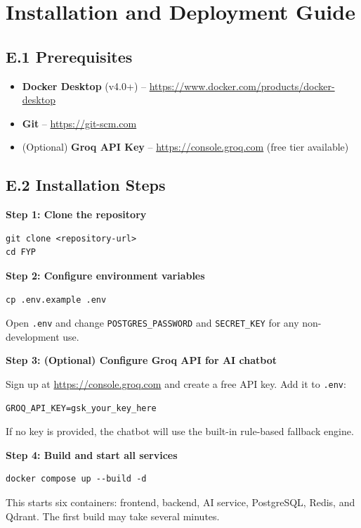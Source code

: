 \documentclass[12pt, a4paper, oneside]{report}
\begin{document}
\chapter{Installation and Deployment Guide}
\label{app:install}

\section*{E.1 Prerequisites}

\begin{itemize}
    \item \textbf{Docker Desktop} (v4.0+) -- \url{https://www.docker.com/products/docker-desktop}
    \item \textbf{Git} -- \url{https://git-scm.com}
    \item (Optional) \textbf{Groq API Key} -- \url{https://console.groq.com} (free tier available)
\end{itemize}

\section*{E.2 Installation Steps}

\textbf{Step 1: Clone the repository}
\begin{verbatim}
git clone <repository-url>
cd FYP
\end{verbatim}

\textbf{Step 2: Configure environment variables}
\begin{verbatim}
cp .env.example .env
\end{verbatim}
Open \texttt{.env} and change \texttt{POSTGRES\_PASSWORD} and \texttt{SECRET\_KEY} for any non-development use.

\textbf{Step 3: (Optional) Configure Groq API for AI chatbot}

Sign up at \url{https://console.groq.com} and create a free API key. Add it to \texttt{.env}:
\begin{verbatim}
GROQ_API_KEY=gsk_your_key_here
\end{verbatim}
If no key is provided, the chatbot will use the built-in rule-based fallback engine.

\textbf{Step 4: Build and start all services}
\begin{verbatim}
docker compose up --build -d
\end{verbatim}
This starts six containers: frontend, backend, AI service, PostgreSQL, Redis, and Qdrant. The first build may take several minutes.
\end{document}

